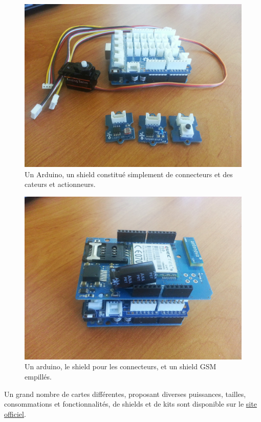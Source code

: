 \documentclass{article}
\begin{document}
\begin{figure}[h!]
    \centering\includegraphics[width=\linewidth/2]{img/arduino_shield.jpg}
    \caption{Un Arduino, un shield constitué simplement de connecteurs et des cateurs et actionneurs.}
\end{figure}


\begin{figure}[h!]
    \centering\includegraphics[width=\linewidth/2]{img/gsm.jpg}
    \caption{Un arduino, le shield pour les connecteurs, et un shield GSM empillés.}
\end{figure}


Un grand nombre de cartes différentes, proposant diverses puissances, tailles, consommations et fonctionnalités, de shields et de kits sont disponible sur le \hyperref[http://arduino.cc/en/Main/Products]{site officiel}.
\end{document}
